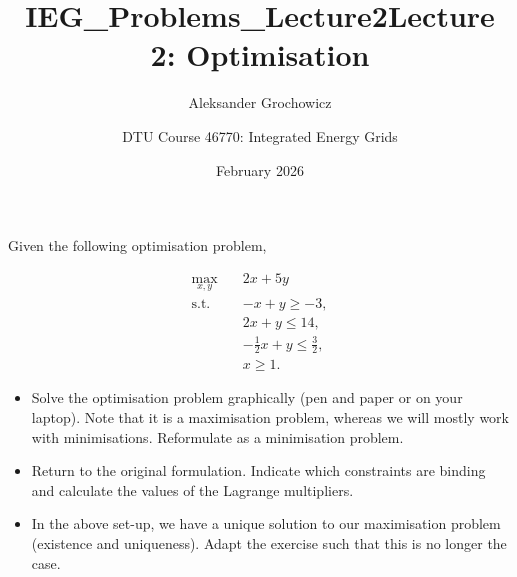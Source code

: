 \documentclass[10pt]{article}
\title{IEG_Problems_Lecture2}
\author{Aleksander Grochowicz}
\date{February 2026}
\newenvironment{problem}[2][Problem]{\begin{trivlist}
\item[\hskip \labelsep {\bfseries #1}\hskip \labelsep {\bfseries #2.}]}{\end{trivlist}}
\begin{document}
 
\title{\textbf{Lecture 2: Optimisation}}
\author{
DTU Course 46770: Integrated Energy Grids }
\maketitle
\begin{problem}{2.1}

Given the following optimisation problem,


\begin{align*}
	\max_{x,y} \quad & 2x + 5y \\
	\text{s.t.} \quad & -x + y \geq -3, \\
	& 2x + y \leq 14, \\
	& -\frac{1}{2}x + y \leq \frac{3}{2}, \\
	& x \geq 1.
\end{align*}



\begin{itemize}
\item[a)] Solve the optimisation problem graphically (pen and paper or on your laptop). Note that it is a maximisation problem, whereas we will mostly work with minimisations. Reformulate as a minimisation problem.
\item[b)] Return to the original formulation. Indicate which constraints are binding and calculate the values of the Lagrange multipliers.
\item[c)] In the above set-up, we have a unique solution to our maximisation problem (existence and uniqueness). Adapt the exercise such that this is no longer the case.
\end{itemize}
\end{problem}

\
\end{document}
